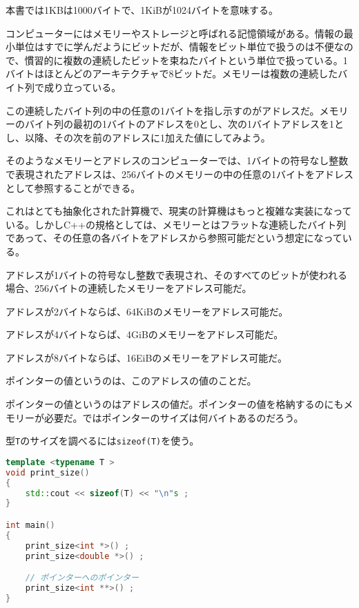 本書では1KBは1000バイトで、1KiBが1024バイトを意味する。


コンピューターにはメモリーやストレージと呼ばれる記憶領域がある。情報の最小単位はすでに学んだようにビットだが、情報をビット単位で扱うのは不便なので、慣習的に複数の連続したビットを束ねたバイトという単位で扱っている。1バイトはほとんどのアーキテクチャで8ビットだ。メモリーは複数の連続したバイト列で成り立っている。

この連続したバイト列の中の任意の1バイトを指し示すのがアドレスだ。メモリーのバイト列の最初の1バイトのアドレスを0とし、次の1バイトアドレスを1とし、以降、その次を前のアドレスに1加えた値にしてみよう。

そのようなメモリーとアドレスのコンピューターでは、1バイトの符号なし整数で表現されたアドレスは、256バイトのメモリーの中の任意の1バイトをアドレスとして参照することができる。

これはとても抽象化された計算機で、現実の計算機はもっと複雑な実装になっている。しかしC++の規格としては、メモリーとはフラットな連続したバイト列であって、その任意の各バイトをアドレスから参照可能だという想定になっている。

アドレスが1バイトの符号なし整数で表現され、そのすべてのビットが使われる場合、256バイトの連続したメモリーをアドレス可能だ。

アドレスが2バイトならば、64KiBのメモリーをアドレス可能だ。

アドレスが4バイトならば、4GiBのメモリーをアドレス可能だ。

アドレスが8バイトならば、16EiBのメモリーをアドレス可能だ。

ポインターの値というのは、このアドレスの値のことだ。


ポインターの値というのはアドレスの値だ。ポインターの値を格納するのにもメモリーが必要だ。ではポインターのサイズは何バイトあるのだろう。

型\texttt{T}のサイズを調べるには\texttt{sizeof(T)}を使う。

\begin{lstlisting}[language={C++}]
template <typename T >
void print_size()
{
    std::cout << sizeof(T) << "\n"s ;
}

int main()
{
    print_size<int *>() ;
    print_size<double *>() ;

    // ポインターへのポインター
    print_size<int **>() ; 
}
\end{lstlisting}

